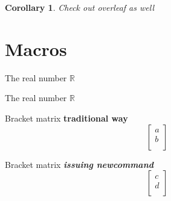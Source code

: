 \documentclass{article}
\newtheorem{corollary}{Corollary}[section]
\newcommand{\R}{\mathbb{R}}
\newcommand{\cv}[2]{\begin{bmatrix}
#1\\
#2\\
\end{bmatrix}
}
\begin{document}
\begin{corollary}
Check out overleaf as well
\end{corollary}


\section{Macros}


The real number $\mathbb{R}$

The real number $\R$

\vspace{20pt}

Bracket matrix \textbf{traditional way}
\[
    \begin{bmatrix}
        a\\
        b\\
    \end{bmatrix}
\]

Bracket matrix \textbf{\textit{issuing newcommand}}
\[
    \cv{c}{d}
\]
\end{document}
